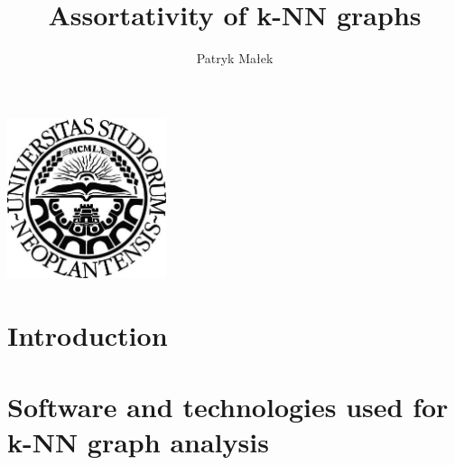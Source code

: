\documentclass[a4paper,11pt]{article}
\newcommand{\mahtitle}{Assortativity of k-NN graphs}
\begin{document}
\label{Title} 
\title{\vspace{1pc} \mahtitle \vspace{4pc}}
\author{Patryk Małek \vspace{-0.7pc}}
\date{}
\maketitle
\thispagestyle{empty}


\vspace{6pc}
\centerline{
\includegraphics[width=0.35\textwidth,height=0.35\textheight,keepaspectratio]{NoviSadLogoGray.jpg}
}
\vspace{8pc}

\clearpage
\begin{abstract}
\label{Abstract}

\end{abstract}


\clearpage
\tableofcontents


\clearpage
\section{Introduction} 



\clearpage
\section{Software and technologies used for k-NN graph analysis}

\end{document}
